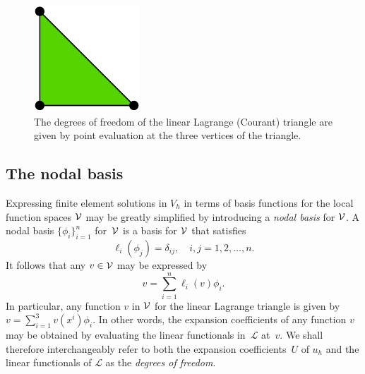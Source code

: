 \begin{figure}
\bwfig
  \centering
  \includegraphics[width=\smallfig]{chapters/kirby-7/pdf/P1.pdf}
  \caption{The degrees of freedom of the linear Lagrange (Courant)
    triangle are given by point evaluation at the three vertices of
    the triangle.}
  \label{fig:P1}
\end{figure}

\subsection{The nodal basis}

Expressing finite element solutions in $V_h$ in terms of basis
functions for the local function spaces $\mathcal{V}$ may be greatly
simplified by introducing a \emph{nodal basis} for $\mathcal{V}$.  A
nodal basis $\{\phi_i\}_{i=1}^{n}$ for~$\mathcal{V}$ is a basis for
$\mathcal{V}$ that satisfies
\begin{equation} \label{eq:nodalbasis}
  \ell_i(\phi_j) = \delta_{ij}, \quad i, j = 1,2,\ldots, n.
\end{equation}
It follows that any $v \in \mathcal{V}$ may be expressed by
\begin{equation}
  v = \sum_{i=1}^{n} \ell_i(v) \phi_i.
\end{equation}
In particular, any function $v$ in $\mathcal{V}$ for the linear
Lagrange triangle is given by $v = \sum_{i=1}^3 v(x^i) \phi_i$. In
other words, the expansion coefficients of any function $v$ may be
obtained by evaluating the linear functionals in~$\mathcal{L}$
at~$v$. We shall therefore interchangeably refer to both the expansion
coefficients~$U$ of $u_h$ and the linear functionals of $\mathcal{L}$
as the \emph{degrees of freedom}.

